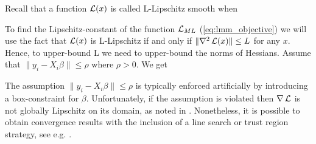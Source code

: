 Recall that a function $\operatorname{\mathcal{L}}(x)$ is called L-Lipschitz smooth when 


To find the Lipschitz-constant of the function $\operatorname{\mathcal{L}}_{ML}$ (\ref{eq:lmm_objective}) we will use the fact that $\operatorname{\mathcal{L}}(x)$ is L-Lipschitz if and only if $\|\nabla^2 \operatorname{\mathcal{L}}(x)\| \leq L$ for any $x$. Hence, to upper-bound L we need to upper-bound the norms of Hessians. %
Assume that $\|y_i - X_i\beta\| \leq \rho$ where $\rho > 0$. We get %


The assumption $\|y_i - X_i\beta\| \leq \rho$ is typically enforced artificially by introducing a box-constraint for $\beta$. Unfortunately, if the assumption is violated then $\nabla\operatorname{\mathcal{L}}$ is not globally Lipschitz on its domain, as noted in \cite{aravkin2022jimtheory}. Nonetheless, it is possible to obtain convergence results with the inclusion of a line search or trust region strategy, see e.g. \cite{Burke-Engle18}.
 